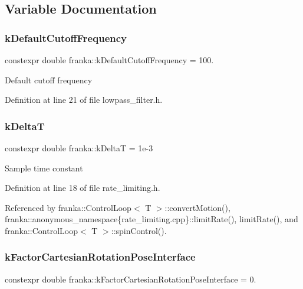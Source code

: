 \subsection{Variable Documentation}
\mbox{\label{namespacefranka_ad8e3b7da346e03181ab5ac138a4171d4}} 
\subsubsection{\texorpdfstring{k\+Default\+Cutoff\+Frequency}{kDefaultCutoffFrequency}}
{\footnotesize\ttfamily constexpr double franka\+::k\+Default\+Cutoff\+Frequency = 100.}

Default cutoff frequency 

Definition at line 21 of file lowpass\+\_\+filter.\+h.

\mbox{\label{namespacefranka_a1e207a0d5a6e90c1e1a78e6e1057120a}} 
\subsubsection{\texorpdfstring{k\+DeltaT}{kDeltaT}}
{\footnotesize\ttfamily constexpr double franka\+::k\+DeltaT = 1e-\/3}

Sample time constant 

Definition at line 18 of file rate\+\_\+limiting.\+h.



Referenced by franka\+::\+Control\+Loop$<$ T $>$\+::convert\+Motion(), franka\+::anonymous\+\_\+namespace\{rate\+\_\+limiting.\+cpp\}\+::limit\+Rate(), limit\+Rate(), and franka\+::\+Control\+Loop$<$ T $>$\+::spin\+Control().

\mbox{\label{namespacefranka_a19166d1a64c5a84f80b4ed3aa0bfb3a0}} 
\subsubsection{\texorpdfstring{k\+Factor\+Cartesian\+Rotation\+Pose\+Interface}{kFactorCartesianRotationPoseInterface}}
{\footnotesize\ttfamily constexpr double franka\+::k\+Factor\+Cartesian\+Rotation\+Pose\+Interface = 0.}

